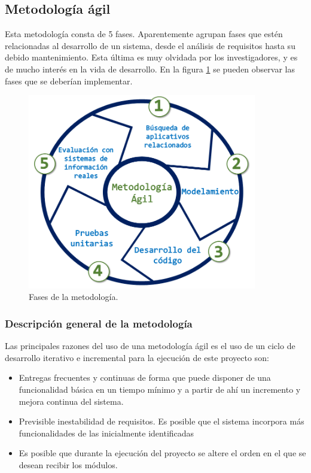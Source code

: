 \documentclass[12pt, openany, xcolor=table]{book}
\begin{document}
	\subsection{Metodología ágil}
	
	Esta metodología consta de 5 fases. Aparentemente agrupan fases que estén relacionadas al desarrollo de un sistema, desde el análisis de requisitos hasta su debido mantenimiento. Esta última es muy olvidada por los investigadores, y es de mucho interés en la vida de desarrollo. En la figura \ref{fig:metod} se pueden observar las fases que se deberían implementar.
	
	\begin{figure}[h!]
		\centering
		\includegraphics[width=10cm]{images/metodologia.png}
		\caption{Fases de la metodología.}
		\label{fig:metod}
	\end{figure}
	
	\subsubsection{Descripción general de la metodología}
	Las principales razones del uso de una metodología ágil es el uso de un ciclo de desarrollo iterativo e incremental para la ejecución de este proyecto son:
	
	\begin{itemize}
		\item Entregas frecuentes y continuas de forma que puede disponer de una funcionalidad básica en un tiempo mínimo y a partir de ahí un incremento y mejora continua del sistema.
		
		\item Previsible inestabilidad de requisitos. Es posible que el sistema incorpora más funcionalidades de las inicialmente identificadas
		
		\item Es posible que durante la ejecución del proyecto se altere el orden en el que se desean recibir los módulos.
	\end{itemize} 
	
\end{document}
